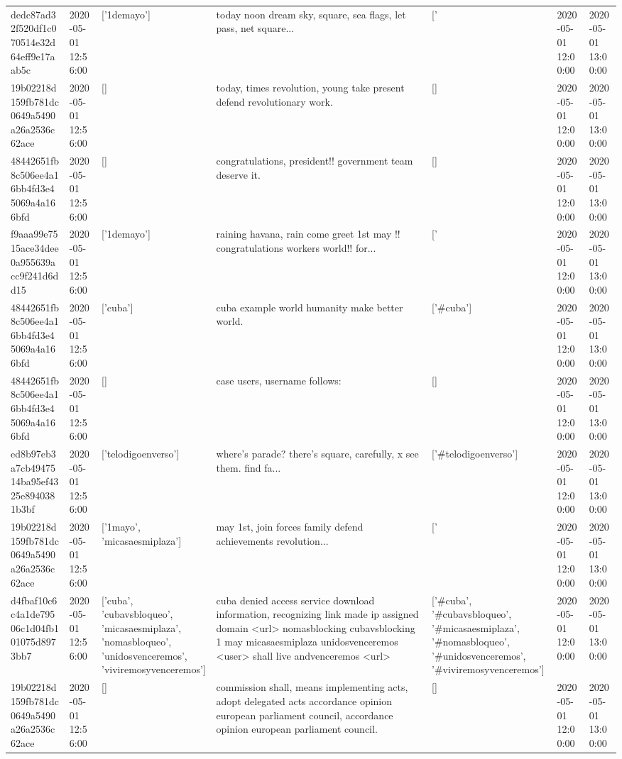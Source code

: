 \begin{tabular}{lllllll}
dedc87ad32f520df1c070514e32d64eff9e17aab5c & 2020-05-01 12:56:00 & ['1demayo'] & today noon dream sky, square, sea flags, let pass, net square... & ['#1demayo'] & 2020-05-01 12:00:00 & 2020-05-01 13:00:00 \\
19b02218d159fb781dc0649a5490a26a2536c62ace & 2020-05-01 12:56:00 & [] & today, times revolution, young take present defend revolutionary work. & [] & 2020-05-01 12:00:00 & 2020-05-01 13:00:00 \\
48442651fb8c506ee4a16bb4fd3e45069a4a166bfd & 2020-05-01 12:56:00 & [] & congratulations, president!! government team deserve it. & [] & 2020-05-01 12:00:00 & 2020-05-01 13:00:00 \\
f9aaa99e7515ace34dee0a955639acc9f241d6dd15 & 2020-05-01 12:56:00 & ['1demayo'] & raining havana, rain come greet 1st may !! congratulations workers world!! for... & ['#1demayo'] & 2020-05-01 12:00:00 & 2020-05-01 13:00:00 \\
48442651fb8c506ee4a16bb4fd3e45069a4a166bfd & 2020-05-01 12:56:00 & ['cuba'] & cuba example world humanity make better world. & ['#cuba'] & 2020-05-01 12:00:00 & 2020-05-01 13:00:00 \\
48442651fb8c506ee4a16bb4fd3e45069a4a166bfd & 2020-05-01 12:56:00 & [] & case users, username follows: & [] & 2020-05-01 12:00:00 & 2020-05-01 13:00:00 \\
ed8b97eb3a7cb4947514ba95ef4325e8940381b3bf & 2020-05-01 12:56:00 & ['telodigoenverso'] & where's parade? there's square, carefully, x see them. find fa... & ['#telodigoenverso'] & 2020-05-01 12:00:00 & 2020-05-01 13:00:00 \\
19b02218d159fb781dc0649a5490a26a2536c62ace & 2020-05-01 12:56:00 & ['1mayo', 'micasaesmiplaza'] & may 1st, join forces family defend achievements revolution... & ['#1mayo', '#micasaesmiplaza'] & 2020-05-01 12:00:00 & 2020-05-01 13:00:00 \\
d4fbaf10c6c4a1de79506c1d04fb101075d8973bb7 & 2020-05-01 12:56:00 & ['cuba', 'cubavsbloqueo', 'micasaesmiplaza', 'nomasbloqueo', 'unidosvenceremos', 'viviremosyvenceremos'] & cuba denied access service download information, recognizing link made ip assigned domain <url> nomasblocking cubavsblocking 1 may micasaesmiplaza unidosvenceremos <user> shall live andvenceremos <url> & ['#cuba', '#cubavsbloqueo', '#micasaesmiplaza', '#nomasbloqueo', '#unidosvenceremos', '#viviremosyvenceremos'] & 2020-05-01 12:00:00 & 2020-05-01 13:00:00 \\
19b02218d159fb781dc0649a5490a26a2536c62ace & 2020-05-01 12:56:00 & [] & commission shall, means implementing acts, adopt delegated acts accordance opinion european parliament council, accordance opinion european parliament council. & [] & 2020-05-01 12:00:00 & 2020-05-01 13:00:00 \\

\end{tabular}
